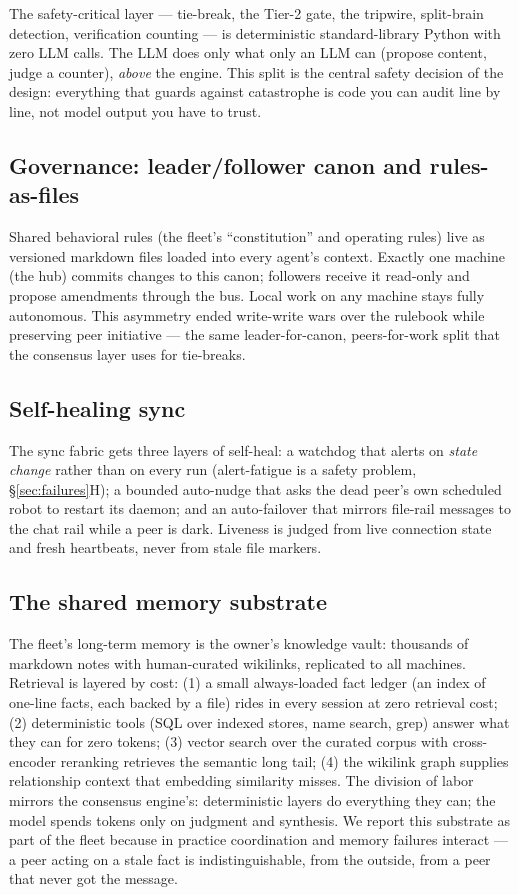 \documentclass[11pt]{article}
\begin{document}
The safety-critical layer --- tie-break, the Tier-2 gate, the tripwire, split-brain detection, verification counting --- is deterministic standard-library Python with zero LLM calls. The LLM does only what only an LLM can (propose content, judge a counter), \emph{above} the engine. This split is the central safety decision of the design: everything that guards against catastrophe is code you can audit line by line, not model output you have to trust.

\subsection{Governance: leader/follower canon and rules-as-files}
Shared behavioral rules (the fleet's ``constitution'' and operating rules) live as versioned markdown files loaded into every agent's context. Exactly one machine (the hub) commits changes to this canon; followers receive it read-only and propose amendments through the bus. Local work on any machine stays fully autonomous. This asymmetry ended write-write wars over the rulebook while preserving peer initiative --- the same leader-for-canon, peers-for-work split that the consensus layer uses for tie-breaks.

\subsection{Self-healing sync}
The sync fabric gets three layers of self-heal: a watchdog that alerts on \emph{state change} rather than on every run (alert-fatigue is a safety problem, \S\ref{sec:failures}H); a bounded auto-nudge that asks the dead peer's own scheduled robot to restart its daemon; and an auto-failover that mirrors file-rail messages to the chat rail while a peer is dark. Liveness is judged from live connection state and fresh heartbeats, never from stale file markers.

\subsection{The shared memory substrate}\label{sec:memory}
The fleet's long-term memory is the owner's knowledge vault: thousands of markdown notes with human-curated wikilinks, replicated to all machines. Retrieval is layered by cost: (1) a small always-loaded fact ledger (an index of one-line facts, each backed by a file) rides in every session at zero retrieval cost; (2) deterministic tools (SQL over indexed stores, name search, grep) answer what they can for zero tokens; (3) vector search over the curated corpus with cross-encoder reranking retrieves the semantic long tail; (4) the wikilink graph supplies relationship context that embedding similarity misses. The division of labor mirrors the consensus engine's: deterministic layers do everything they can; the model spends tokens only on judgment and synthesis. We report this substrate as part of the fleet because in practice coordination and memory failures interact --- a peer acting on a stale fact is indistinguishable, from the outside, from a peer that never got the message.
\end{document}
